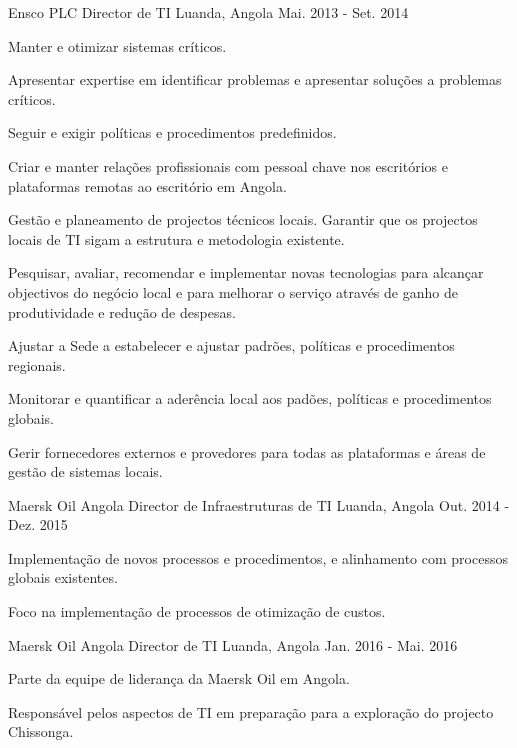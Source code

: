 \begin{cventries}
\cventry
{Ensco PLC} %
{Director de TI} %
{Luanda, Angola} %
{Mai. 2013 - Set. 2014} %
{ %
\begin{cvitems}
\item {Manter e otimizar sistemas críticos.}
\item {Apresentar expertise em identificar problemas e apresentar soluções a problemas críticos.}
\item {Seguir e exigir políticas e procedimentos predefinidos.}
\item {Criar e manter relações profissionais com pessoal chave nos escritórios e plataformas remotas ao escritório em Angola.}
\item {Gestão e planeamento de projectos técnicos locais. Garantir que os projectos locais de TI sigam a estrutura e metodologia existente.}
\item {Pesquisar, avaliar, recomendar e implementar novas tecnologias para alcançar objectivos do negócio local e para melhorar o serviço através de ganho de produtividade e redução de despesas.}
\item {Ajustar a Sede a estabelecer e ajustar padrões, políticas e procedimentos regionais.}
\item {Monitorar e quantificar a aderência local aos padões, políticas e procedimentos globais.}
\item {Gerir fornecedores externos e provedores para todas as plataformas e áreas de gestão de sistemas locais.}
\end{cvitems}
}


\cventry
{Maersk Oil Angola} %
{Director de Infraestruturas de TI} %
{Luanda, Angola} %
{Out. 2014 - Dez. 2015} %
{ %
\begin{cvitems}
\item {Implementação de novos processos e procedimentos, e alinhamento com processos globais existentes.}
\item {Foco na implementação de processos de otimização de custos.}
\end{cvitems}
}


\cventry
{Maersk Oil Angola} %
{Director de TI} %
{Luanda, Angola} %
{Jan. 2016 - Mai. 2016} %
{ %
\begin{cvitems}
\item {Parte da equipe de liderança da Maersk Oil em Angola.}
\item {Responsável pelos aspectos de TI em preparação para a exploração do projecto Chissonga.}
\end{cvitems}
}


\end{cventries}
